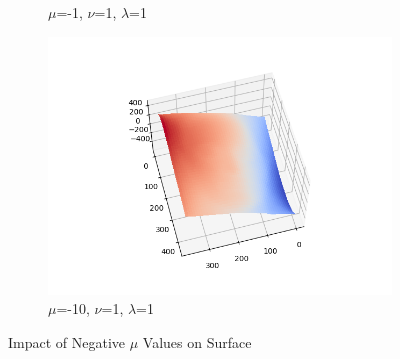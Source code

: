 \documentclass{article}
\begin{document}
\begin{figure}[H]
\begin{subfigure}{0.32\textwidth}
		\caption{$\mu$=-1, $\nu$=1, $\lambda$=1}
	\end{subfigure}
	\hfill
	\begin{subfigure}{0.32\textwidth}
		\centering
		\includegraphics[width=\textwidth]{./src/2f_mu_change/faceCalibrated_mu_-10_v_1_lambda_1.png}
		\caption{$\mu$=-10, $\nu$=1, $\lambda$=1}
	\end{subfigure}
	
	\caption{Impact of Negative $\mu$ Values on Surface}
	\label{fig:u_n_vl}
\end{figure}
\end{document}
